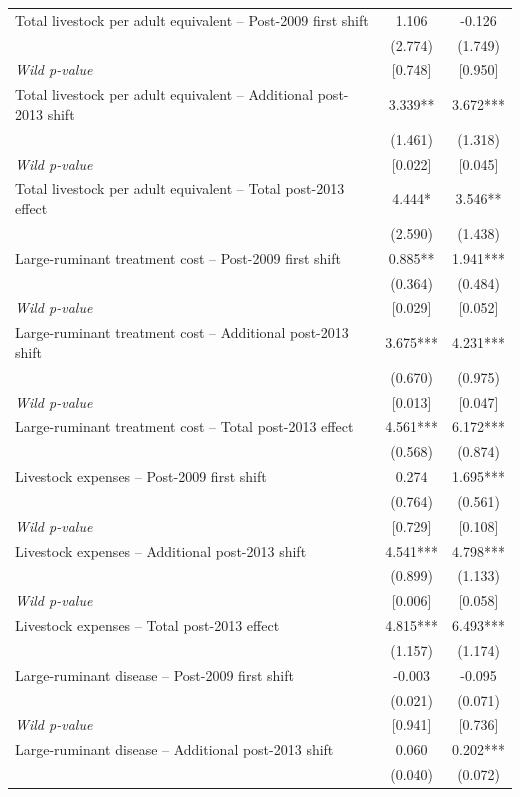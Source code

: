 \begin{table}[!htbp]
\begin{tabular}{lcc}
\addlinespace
Total livestock per adult equivalent -- Post-2009 first shift & 1.106 & -0.126 \\
  & (2.774) & (1.749) \\
\emph{Wild p-value} & [0.748] & [0.950] \\
Total livestock per adult equivalent -- Additional post-2013 shift & 3.339** & 3.672*** \\
  & (1.461) & (1.318) \\
\emph{Wild p-value} & [0.022] & [0.045] \\
Total livestock per adult equivalent -- Total post-2013 effect & 4.444* & 3.546** \\
  & (2.590) & (1.438) \\
\addlinespace
Large-ruminant treatment cost -- Post-2009 first shift & 0.885** & 1.941*** \\
  & (0.364) & (0.484) \\
\emph{Wild p-value} & [0.029] & [0.052] \\
Large-ruminant treatment cost -- Additional post-2013 shift & 3.675*** & 4.231*** \\
  & (0.670) & (0.975) \\
\emph{Wild p-value} & [0.013] & [0.047] \\
Large-ruminant treatment cost -- Total post-2013 effect & 4.561*** & 6.172*** \\
  & (0.568) & (0.874) \\
\addlinespace
Livestock expenses -- Post-2009 first shift & 0.274 & 1.695*** \\
  & (0.764) & (0.561) \\
\emph{Wild p-value} & [0.729] & [0.108] \\
Livestock expenses -- Additional post-2013 shift & 4.541*** & 4.798*** \\
  & (0.899) & (1.133) \\
\emph{Wild p-value} & [0.006] & [0.058] \\
Livestock expenses -- Total post-2013 effect & 4.815*** & 6.493*** \\
  & (1.157) & (1.174) \\
\addlinespace
Large-ruminant disease -- Post-2009 first shift & -0.003 & -0.095 \\
  & (0.021) & (0.071) \\
\emph{Wild p-value} & [0.941] & [0.736] \\
Large-ruminant disease -- Additional post-2013 shift & 0.060 & 0.202*** \\
  & (0.040) & (0.072) \\

\end{tabular}
\end{table}
